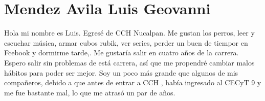 \chapter{Mendez Avila Luis Geovanni}


Hola mi nombre es Luis. Egresé de CCH Nucalpan. Me gustan los perros, leer y escuchar música, armar cubos rubik, ver series, perder un buen de tiempor en Fcebook y dormirme tarde,.
Me gustaría salir en cuatro años de la carrera. Espero salir sin problemas de está carrera, así que me propendré cambiar malos hábitos para poder ser mejor.
Soy un poco más grande que algunos de mis compañeros, debido a que antes de entrar a CCH , había ingresado al CECyT 9 y me fue bastante mal, lo que me atrasó un par de años.
 

